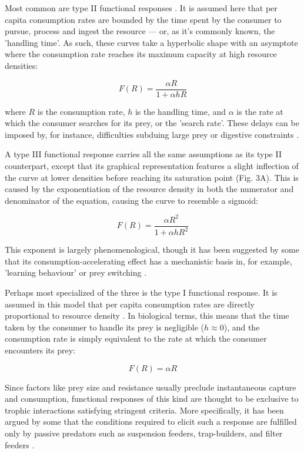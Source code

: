 \documentclass[11pt]{article}
\begin{document}
    Most common are type II functional responses  \citep{hassell1976components, begon1996ecology,jeschke2004consumer}. It is assumed here that per capita consumption rates are bounded by the time spent by the consumer to pursue, process and ingest the resource — or, as it's commonly known, the 'handling time'. As such, these curves take a hyperbolic shape with an asymptote where the consumption rate reaches its maximum capacity at high resource densities:
    
    $$
        F(R) = \frac{\alpha R}{1+\alpha hR}     
    $$
    
    where $R$ is the consumption rate, $h$ is the handling time, and $\alpha$ is the rate at which the consumer searches for its prey, or the 'search rate'. These delays can be imposed by, for instance, difficulties subduing large prey \citep{holling1959b,jeschke2002predator,okuyama2015egg} or digestive constraints \citep{jeschke2002predator,van2004digestively}. 
    
    A type III functional response carries all the same assumptions as its type II counterpart, except that its graphical representation features a slight inflection of the curve at lower densities before reaching its saturation point (Fig. 3A). This is caused by the exponentiation of the resource density in both the numerator and denominator of the equation, causing the curve to resemble a sigmoid:
    
    $$
        F(R) = \frac{\alpha R^2}{1+\alpha hR^2}
    $$
    
    This exponent is largely phenomenological, though it has been suggested by some that its consumption-accelerating effect has a mechanistic basis in, for example, 'learning behaviour' \citep{real1977kinetics, holling1965functional} or prey switching \citep{murdoch1977stabilizing}.
    
    Perhaps most specialized of the three is the type I functional response. It is assumed in this model that per capita consumption rates are directly proportional to resource density \citep{holling1959a}. In biological terms, this means that the time taken by the consumer to handle its prey is negligible ($h\approx0$), and the consumption rate is simply equivalent to the rate at which the consumer encounters its prey:
    
    $$
        F(R) = \alpha R
    $$
    
    Since factors like prey size and resistance usually preclude instantaneous capture and consumption, functional responses of this kind are thought to be exclusive to trophic interactions satisfying stringent criteria. More specifically, it has been argued by some that the conditions required to elicit such a response are fulfilled only by passive predators such as suspension feeders, trap-builders, and filter feeders \citep{jeschke2004consumer}.
    
\end{document}
